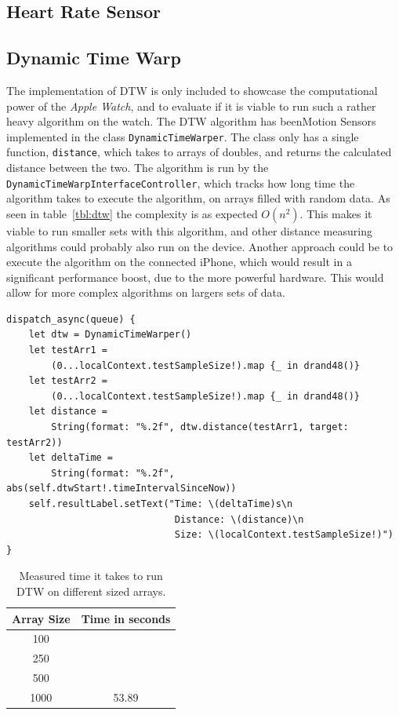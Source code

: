 \subsection{Heart Rate Sensor}


\subsection{Dynamic Time Warp}
The implementation of DTW is only included to showcase the computational power of
the \textit{Apple Watch}, and to evaluate if it is viable to run such a rather
heavy algorithm on the watch.
The DTW algorithm has beenMotion Sensors implemented in the class
\texttt{DynamicTimeWarper}. The class only has a single function,
    \texttt{distance}, which takes to arrays of doubles, and returns the
    calculated distance between the two. The algorithm is run by the
    \texttt{DynamicTimeWarpInterfaceController}, which tracks how long time the
    algorithm takes to execute the algorithm, on arrays filled with random data. 
As seen in table~\ref{tbl:dtw} the complexity is as expected $O(n^2)$.
This makes it viable to run smaller sets with this algorithm, and other distance
measuring algorithms could probably also run on the device.
Another approach could be to execute the algorithm on the connected iPhone,
which would result in a significant performance boost, due to the more powerful
hardware. This would allow for more complex algorithms on largers sets of data.


\begin{lstlisting}[label={lst:dtw},caption={Testing of the implemented DTW
    algorithm, within the DynamicTimeWarpInterfaceController},basicstyle=\small]
dispatch_async(queue) {
    let dtw = DynamicTimeWarper()
    let testArr1 = 
        (0...localContext.testSampleSize!).map {_ in drand48()}
    let testArr2 = 
        (0...localContext.testSampleSize!).map {_ in drand48()}
    let distance = 
        String(format: "%.2f", dtw.distance(testArr1, target: testArr2))
    let deltaTime = 
        String(format: "%.2f", abs(self.dtwStart!.timeIntervalSinceNow))
    self.resultLabel.setText("Time: \(deltaTime)s\n
                              Distance: \(distance)\n
                              Size: \(localContext.testSampleSize!)")
}
\end{lstlisting}

\begin{table}[!h]
\caption{Measured time it takes to run DTW on different sized arrays.}
\label{tbl:rec}
\centering
\begin{tabular}{ |c|c|  }
\hline
Array Size  & Time in seconds\\
\hline
100    &        \\
250    &        \\
500    &        \\
1000   & 53.89  \\
\hline
\end{tabular}
\end{table}

